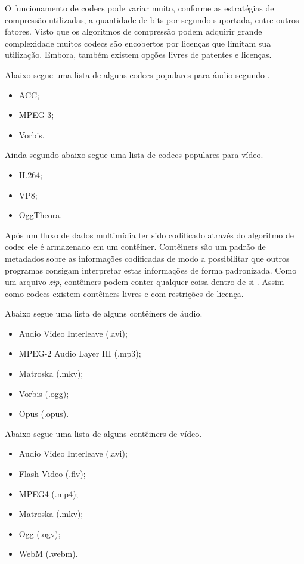 O funcionamento de codecs pode variar muito, conforme as estratégias
de compressão utilizadas, a quantidade de bits por segundo suportada,
entre outros fatores. Visto que os algoritmos de compressão podem
adquirir grande complexidade muitos codecs são encobertos por licenças
que limitam sua utilização. Embora, também existem opções
livres de patentes e licenças.

Abaixo segue uma lista de alguns codecs populares para áudio segundo
\citet[p. 67]{proHtml5}.

\begin{itemize}
    \item ACC;
    \item MPEG-3;
    \item Vorbis.
\end{itemize}

Ainda segundo \citet[p. 67]{proHtml5} abaixo segue uma lista de codecs populares para vídeo.
\begin{itemize}
    \item H.264;
    \item VP8;
    \item OggTheora.
\end{itemize}

Após um fluxo de dados multimídia ter sido codificado através do
algoritmo de codec ele é armazenado em um contêiner. Contêiners
são um padrão de metadados sobre as informações codificadas
de modo a possibilitar que outros programas consigam interpretar
estas informações de forma padronizada. Como um arquivo
\textit{zip}, contêiners podem conter qualquer coisa dentro de si
\autocite{diveIntohtml}. Assim como codecs existem contêiners livres e
com restrições de licença.

\noindent Abaixo segue uma lista de alguns contêiners de áudio.
\begin{itemize}
    \item Audio Video Interleave (.avi);
    \item MPEG-2 Audio Layer III (.mp3);
    \item Matroska (.mkv);
    \item Vorbis (.ogg);
    \item Opus (.opus).
\end{itemize}

\noindent Abaixo segue uma lista de alguns contêiners de vídeo.
\begin{itemize}
    \item Audio Video Interleave (.avi);
    \item Flash Video (.flv);
    \item MPEG4 (.mp4);
    \item Matroska (.mkv);
    \item Ogg (.ogv);
    \item WebM (.webm).
\end{itemize}

